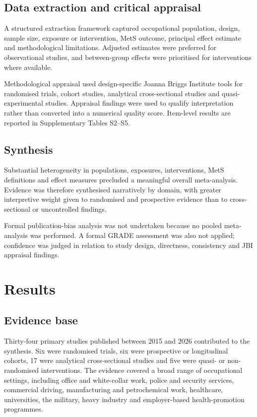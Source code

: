\documentclass[11pt]{article}
\begin{document}

\subsection{Data extraction and critical appraisal}
A structured extraction framework captured occupational population, design, sample size, exposure or intervention, MetS outcome, principal effect estimate and methodological limitations. Adjusted estimates were preferred for observational studies, and between-group effects were prioritised for interventions where available.

Methodological appraisal used design-specific Joanna Briggs Institute tools for randomised trials, cohort studies, analytical cross-sectional studies and quasi-experimental studies. Appraisal findings were used to qualify interpretation rather than converted into a numerical quality score. Item-level results are reported in Supplementary Tables S2--S5.

\subsection{Synthesis}
Substantial heterogeneity in populations, exposures, interventions, MetS definitions and effect measures precluded a meaningful overall meta-analysis. Evidence was therefore synthesised narratively by domain, with greater interpretive weight given to randomised and prospective evidence than to cross-sectional or uncontrolled findings.

Formal publication-bias analysis was not undertaken because no pooled meta-analysis was performed. A formal GRADE assessment was also not applied; confidence was judged in relation to study design, directness, consistency and JBI appraisal findings.

\section{Results}

\subsection{Evidence base}

Thirty-four primary studies published between 2015 and 2026 contributed to the synthesis. Six were randomised trials, six were prospective or longitudinal cohorts, 17 were analytical cross-sectional studies and five were quasi- or non-randomised interventions. The evidence covered a broad range of occupational settings, including office and white-collar work, police and security services, commercial driving, manufacturing and petrochemical work, healthcare, universities, the military, heavy industry and employer-based health-promotion programmes.
\end{document}
